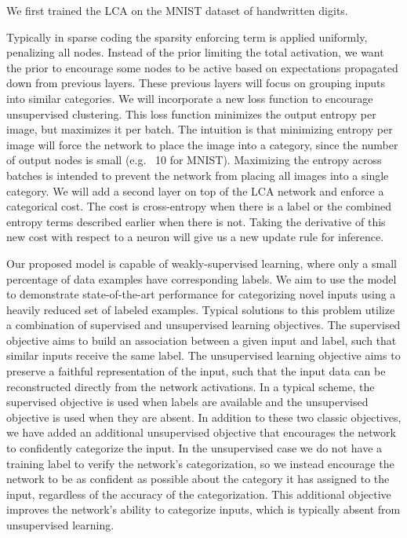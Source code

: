 We first trained the LCA on the MNIST dataset of handwritten digits. 

Typically in sparse coding the sparsity enforcing term is applied uniformly, penalizing all nodes. Instead of the prior limiting the total activation, we want the prior to encourage some nodes to be active based on expectations propagated down from previous layers. These previous layers will focus on grouping inputs into similar categories. We will incorporate a new loss function to encourage unsupervised clustering. This loss function minimizes the output entropy per image, but maximizes it per batch. The intuition is that minimizing entropy per image will force the network to place the image into a category, since the number of output nodes is small (e.g. ~10 for MNIST). Maximizing the entropy across batches is intended to prevent the network from placing all images into a single category. We will add a second layer on top of the LCA network and enforce a categorical cost. The cost is cross-entropy when there is a label or the combined entropy terms described earlier when there is not. Taking the derivative of this new cost with respect to a neuron will give us a new update rule for inference.

Our proposed model is capable of weakly-supervised learning, where only a small percentage of data examples have corresponding labels. We aim to use the model to demonstrate state-of-the-art performance for categorizing novel inputs using a heavily reduced set of labeled examples. Typical solutions to this problem utilize a combination of supervised and unsupervised learning objectives. The supervised objective aims to build an association between a given input and label, such that similar inputs receive the same label. The unsupervised learning objective aims to preserve a faithful representation of the input, such that the input data can be reconstructed directly from the network activations. In a typical scheme, the supervised objective is used when labels are available and the unsupervised objective is used when they are absent. In addition to these two classic objectives, we have added an additional unsupervised objective that encourages the network to confidently categorize the input. In the unsupervised case we do not have a training label to verify the network’s categorization, so we instead encourage the network to be as confident as possible about the category it has assigned to the input, regardless of the accuracy of the categorization. This additional objective improves the network’s ability to categorize inputs, which is typically absent from unsupervised learning.


